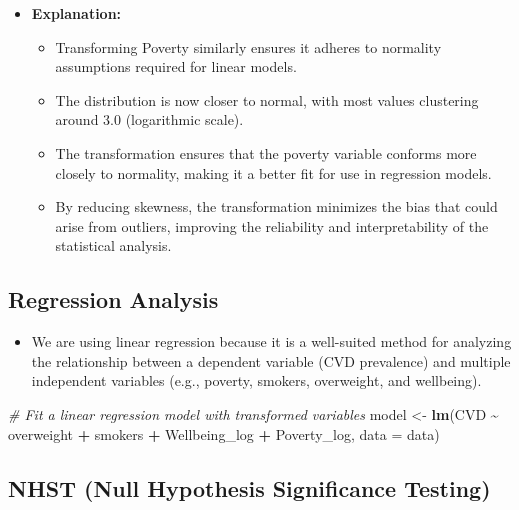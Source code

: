 \documentclass[
]{article}
\newenvironment{Shaded}{\begin{snugshade}}{\end{snugshade}}
\newcommand{\AttributeTok}[1]{\textcolor[rgb]{0.13,0.29,0.53}{#1}}
\newcommand{\CommentTok}[1]{\textcolor[rgb]{0.56,0.35,0.01}{\textit{#1}}}
\newcommand{\FunctionTok}[1]{\textcolor[rgb]{0.13,0.29,0.53}{\textbf{#1}}}
\newcommand{\NormalTok}[1]{#1}
\newcommand{\OtherTok}[1]{\textcolor[rgb]{0.56,0.35,0.01}{#1}}
\newcommand{\SpecialCharTok}[1]{\textcolor[rgb]{0.81,0.36,0.00}{\textbf{#1}}}
\providecommand{\tightlist}{%
  \setlength{\itemsep}{0pt}\setlength{\parskip}{0pt}}
\begin{document}
\begin{itemize}
\tightlist
\item
  \textbf{Explanation:}

  \begin{itemize}
  \tightlist
  \item
    Transforming Poverty similarly ensures it adheres to normality
    assumptions required for linear models.
  \item
    The distribution is now closer to normal, with most values
    clustering around 3.0 (logarithmic scale).
  \item
    The transformation ensures that the poverty variable conforms more
    closely to normality, making it a better fit for use in regression
    models.
  \item
    By reducing skewness, the transformation minimizes the bias that
    could arise from outliers, improving the reliability and
    interpretability of the statistical analysis.
  \end{itemize}
\end{itemize}

\subsection{Regression Analysis}\label{regression-analysis}

\begin{itemize}
\tightlist
\item
  We are using linear regression because it is a well-suited method for
  analyzing the relationship between a dependent variable (CVD
  prevalence) and multiple independent variables (e.g., poverty,
  smokers, overweight, and wellbeing).
\end{itemize}

\begin{Shaded}
\begin{Highlighting}[]
\CommentTok{\# Fit a linear regression model with transformed variables}
\NormalTok{model }\OtherTok{\textless{}{-}} \FunctionTok{lm}\NormalTok{(CVD }\SpecialCharTok{\textasciitilde{}}\NormalTok{ overweight }\SpecialCharTok{+}\NormalTok{ smokers }\SpecialCharTok{+}\NormalTok{ Wellbeing\_log }\SpecialCharTok{+}\NormalTok{ Poverty\_log, }\AttributeTok{data =}\NormalTok{ data)}
\end{Highlighting}
\end{Shaded}

\subsection{NHST (Null Hypothesis Significance
Testing)}\label{nhst-null-hypothesis-significance-testing}
\end{document}
